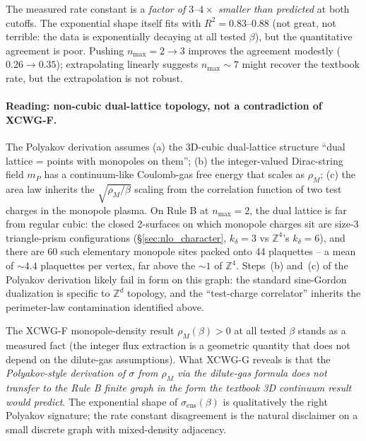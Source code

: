 \documentclass[11pt]{article}
\begin{document}
The measured rate constant is a \emph{factor of $3$--$4\times$ smaller than
predicted} at both cutoffs. The exponential shape itself fits with
$R^2=0.83$--$0.88$ (not great, not terrible: the data is exponentially
decaying at all tested $\beta$), but the quantitative agreement is poor.
Pushing $n_\text{max}=2\to 3$ improves the agreement modestly
($0.26\to 0.35$); extrapolating linearly suggests $n_\text{max}\sim 7$ might
recover the textbook rate, but the extrapolation is not robust.

\paragraph{Reading: non-cubic dual-lattice topology, not a contradiction of
XCWG-F.} The Polyakov derivation assumes (a) the 3D-cubic dual-lattice
structure ``dual lattice = points with monopoles on them''; (b) the
integer-valued Dirac-string field $m_P$ has a continuum-like Coulomb-gas
free energy that scales as $\rho_M$; (c) the area law inherits the
$\sqrt{\rho_M/\beta}$ scaling from the correlation function of two test
charges in the monopole plasma. On Rule B at $n_\text{max}=2$, the
dual lattice is far from regular cubic: the closed 2-surfaces on which
monopole charges sit are size-3 triangle-prism configurations
(\S\ref{sec:nlo_character}, $k_\delta=3$ vs $\mathbb{Z}^4$'s
$k_\delta=6$), and there are 60 such elementary monopole sites packed onto
44 plaquettes -- a mean of $\sim 4.4$ plaquettes per vertex, far above the
$\sim 1$ of $\mathbb{Z}^4$. Steps~(b) and~(c) of the Polyakov derivation
likely fail in form on this graph: the standard sine-Gordon dualization is
specific to $\mathbb{Z}^d$ topology, and the ``test-charge correlator''
inherits the perimeter-law contamination identified above.

The XCWG-F monopole-density result $\rho_M(\beta)>0$ at all tested $\beta$
stands as a measured fact (the integer flux extraction is a geometric
quantity that does not depend on the dilute-gas assumptions). What XCWG-G
reveals is that the \emph{Polyakov-style derivation of $\sigma$ from $\rho_M$
via the dilute-gas formula does not transfer to the Rule B finite graph in
the form the textbook 3D continuum result would predict}. The exponential
shape of $\sigma_\text{ens}(\beta)$ is qualitatively the right Polyakov
signature; the rate constant disagreement is the natural disclaimer on a
small discrete graph with mixed-density adjacency.
\end{document}
